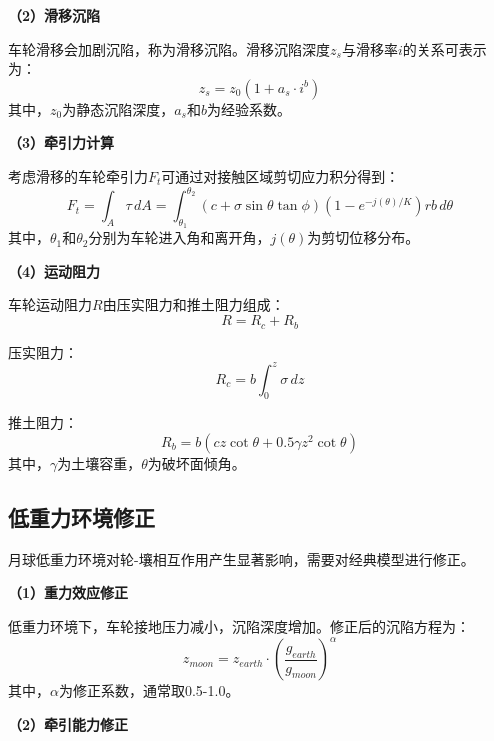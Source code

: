 \textbf{（2）滑移沉陷}

车轮滑移会加剧沉陷，称为滑移沉陷。滑移沉陷深度$z_s$与滑移率$i$的关系可表示为：
\begin{equation}
    z_s = z_0(1 + a_s \cdot i^b)
    \label{eq:slip_sinkage}
\end{equation}
其中，$z_0$为静态沉陷深度，$a_s$和$b$为经验系数。

\textbf{（3）牵引力计算}

考虑滑移的车轮牵引力$F_t$可通过对接触区域剪切应力积分得到：
\begin{equation}
    F_t = \int_A \tau \, dA = \int_{\theta_1}^{\theta_2} (c + \sigma\sin\theta\tan\phi)\left(1 - e^{-j(\theta)/K}\right) r b \, d\theta
    \label{eq:traction}
\end{equation}
其中，$\theta_1$和$\theta_2$分别为车轮进入角和离开角，$j(\theta)$为剪切位移分布。

\textbf{（4）运动阻力}

车轮运动阻力$R$由压实阻力和推土阻力组成：
\begin{equation}
    R = R_c + R_b
    \label{eq:resistance}
\end{equation}

压实阻力：
\begin{equation}
    R_c = b\int_0^z \sigma \, dz
    \label{eq:compact_res}
\end{equation}

推土阻力：
\begin{equation}
    R_b = b\left(c z \cot\theta + 0.5 \gamma z^2 \cot\theta\right)
    \label{eq:bulldozing_res}
\end{equation}
其中，$\gamma$为土壤容重，$\theta$为破坏面倾角。

\subsection{低重力环境修正}
\label{subsec:low_gravity}

月球低重力环境对轮-壤相互作用产生显著影响，需要对经典模型进行修正。

\textbf{（1）重力效应修正}

低重力环境下，车轮接地压力减小，沉陷深度增加。修正后的沉陷方程为：
\begin{equation}
    z_{moon} = z_{earth} \cdot \left(\frac{g_{earth}}{g_{moon}}\right)^\alpha
    \label{eq:gravity_sinkage}
\end{equation}
其中，$\alpha$为修正系数，通常取0.5-1.0。

\textbf{（2）牵引能力修正}

